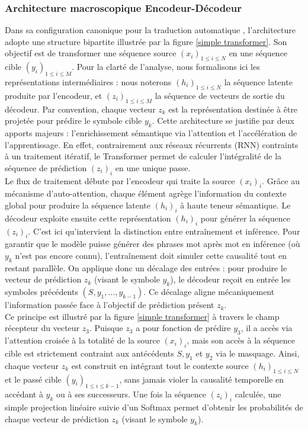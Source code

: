 \subsubsection{Architecture macroscopique Encodeur-Décodeur}
Dans sa configuration canonique pour la traduction automatique \cite{vaswani_attention_2017}, l'architecture adopte une structure bipartite illustrée par la figure \ref{simple transformer}. Son objectif est de transformer une séquence source $(x_i)_{1 \le i \le N}$ en une séquence cible $(y_i)_{1 \le i \le M}$. Pour la clarté de l'analyse, nous formalisons ici les représentations intermédiaires : nous noterons $(h_i)_{1 \le i \le N}$ la séquence latente produite par l'encodeur, et $(z_i)_{1 \le i \le M}$ la séquence de vecteurs de sortie du décodeur. Par convention, chaque vecteur $z_k$ est la représentation destinée à être projetée pour prédire le symbole cible $y_k$. Cette architecture se justifie par deux apports majeurs : l'enrichissement sémantique via l'attention et l'accélération de l'apprentissage. En effet, contrairement aux réseaux récurrents (RNN) contraints à un traitement itératif, le Transformer permet de calculer l'intégralité de la séquence de prédiction $(z_i)_i$ en une unique passe.\\

Le flux de traitement débute par l'encodeur qui traite la source $(x_i)_i$. Grâce au mécanisme d'auto-attention, chaque élément agrège l'information du contexte global pour produire la séquence latente $(h_i)_i$ à haute teneur sémantique. Le décodeur exploite ensuite cette représentation $(h_i)_i$ pour générer la séquence $(z_i)_i$. C'est ici qu'intervient la distinction entre entraînement et inférence. Pour garantir que le modèle puisse générer des phrases mot après mot en inférence (où $y_k$ n'est pas encore connu), l'entraînement doit simuler cette causalité tout en restant parallèle. On applique donc un décalage des entrées : pour produire le vecteur de prédiction $z_k$ (visant le symbole $y_k$), le décodeur reçoit en entrée les symboles précédents $(S, y_1, \dots, y_{k-1})$. Ce décalage aligne mécaniquement l'information passée face à l'objectif de prédiction présent $z_k$.\\

Ce principe est illustré par la figure \ref{simple transformer} à travers le champ récepteur du vecteur $z_3$. Puisque $z_3$ a pour fonction de prédire $y_3$, il a accès via l'attention croisée à la totalité de la source $(x_i)_i$, mais son accès à la séquence cible est strictement contraint aux antécédents $S, y_1$ et $y_2$ via le masquage. Ainsi, chaque vecteur $z_k$ est construit en intégrant tout le contexte source $(h_i)_{1 \le i \le N}$ et le passé cible $(y_i)_{1 \le i \le k-1}$, sans jamais violer la causalité temporelle en accédant à $y_k$ ou à ses successeurs. Une fois la séquence $(z_i)_i$ calculée, une simple projection linéaire suivie d'un Softmax permet d'obtenir les probabilités de chaque vecteur de prédiction $z_k$ (visant le symbole $y_k$).\\


